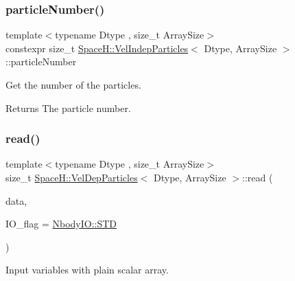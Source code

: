 \subsubsection{\texorpdfstring{particle\+Number()}{particleNumber()}}
{\footnotesize\ttfamily template$<$typename Dtype , size\+\_\+t Array\+Size$>$ \\
constexpr size\+\_\+t \mbox{\hyperlink{class_space_h_1_1_vel_indep_particles}{Space\+H\+::\+Vel\+Indep\+Particles}}$<$ Dtype, Array\+Size $>$\+::particle\+Number\hspace{0.3cm}{\ttfamily [inline]}}



Get the number of the particles. 

\begin{DoxyReturn}{Returns}
The particle number. 
\end{DoxyReturn}
\mbox{\label{class_space_h_1_1_vel_dep_particles_a8bcbe3fac720dc62485e08f5098cb477}} 
\subsubsection{\texorpdfstring{read()}{read()}}
{\footnotesize\ttfamily template$<$typename Dtype , size\+\_\+t Array\+Size$>$ \\
size\+\_\+t \mbox{\hyperlink{class_space_h_1_1_vel_dep_particles}{Space\+H\+::\+Vel\+Dep\+Particles}}$<$ Dtype, Array\+Size $>$\+::read (\begin{DoxyParamCaption}\item[{const \mbox{\hyperlink{class_space_h_1_1_vel_indep_particles_abca40159a816385790d5a6fd19c1dc6d}{Scalar\+Buffer}} \&}]{data,  }\item[{const \mbox{\hyperlink{namespace_space_h_a296a8bae763a754564bfdce216e31b59}{Nbody\+IO}}}]{I\+O\+\_\+flag = {\ttfamily \mbox{\hyperlink{namespace_space_h_a296a8bae763a754564bfdce216e31b59ac6ce23be5d350ce18a665427d2d950f7}{Nbody\+I\+O\+::\+S\+TD}}} }\end{DoxyParamCaption})\hspace{0.3cm}{\ttfamily [inline]}}



Input variables with plain scalar array. 

